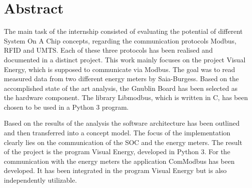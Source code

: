 \documentclass[Bachelorarbeit.tex]{subfiles}
\begin{document}
\chapter*{Abstract}
The main task of the internship consisted of evaluating the potential of different System On A Chip concepts, regarding the communication protocols Modbus, RFID and UMTS. 
Each of these three protocols has been realised and documented in a distinct project. 
This work mainly focuses on the project Visual Energy, which is supposed to communicate via Modbus. 
The goal was to read measured data from two different energy meters by Saia-Burgess. 
Based on the accomplished state of the art analysis, the Gnublin Board has been selected as the hardware component. 
The library Libmodbus, which is written in C, has been chosen to be used in a Python 3 program. 
\begin{comment}
Based on the results of the analysis the software architecture has been outlined and concept model.
\end{comment}
Based on the results of the analysis the software architecture has been outlined and then transferred into a concept model.
The focus of the implementation clearly lies on the communication of the SOC and the energy meters. 
The result of the project is the program Visual Energy, developed in Python 3. 
For the communication with the energy meters the application ComModbus has been developed. 
It has been integrated in the program Visual Energy but is also independently utilizable.
\end{document}
